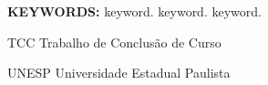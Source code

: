 \documentclass[
  12pt,		%
  a4paper,	%
  openright,%
  oneside,	%
  chapter=TITLE,		%
  section=TITLE,		%
  english,	%
  french,	%
  spanish,	%
  brazil	%
]{abntex2}
\begin{document}
    \begin{resumo}[Abstract] %
    
        \lipsum[1] %
        
        \vspace*{0.5cm}
        
        \noindent\textbf{\MakeUppercase{Keywords: }} keyword. keyword. keyword.
    
    \end{resumo}
    
    
    \listoffigures*
    \newpage
    
    
    \listoftables*
    \newpage
    
    
    \begin{siglas}
        \item[TCC] Trabalho de Conclusão de Curso
        \item[UNESP] Universidade Estadual Paulista
    \end{siglas}
    
\end{document}
